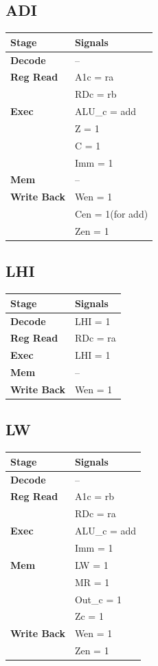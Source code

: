 \documentclass{article}
\begin{document}
\subsection*{ADI}
\begin{tabular}{|l|l|}
\hline
\textbf{Stage} & \textbf{Signals}\\
\hline
\textbf{Decode} & --\\
\hline
\textbf{Reg Read} & A1c = ra\\
                  & RDc = rb\\
\hline
\textbf{Exec} & ALU\_c = add\\
              & Z = 1\\
              & C = 1\\
              & Imm = 1\\
\hline
\textbf{Mem} & --\\
\hline
\textbf{Write Back} & Wen = 1\\
                    & Cen = 1(for add)\\
                    & Zen = 1\\
\hline
\end{tabular}

\subsection*{LHI}
\begin{tabular}{|l|l|}
\hline
\textbf{Stage} & \textbf{Signals}\\
\hline
\textbf{Decode} & LHI = 1\\
\hline
\textbf{Reg Read} & RDc = ra\\
\hline
\textbf{Exec} & LHI = 1\\
\hline
\textbf{Mem} & --\\
\hline
\textbf{Write Back} & Wen = 1\\
\hline
\end{tabular}

\subsection*{LW}
\begin{tabular}{|l|l|}
\hline
\textbf{Stage} & \textbf{Signals}\\
\hline
\textbf{Decode} & --\\
\hline
\textbf{Reg Read} & A1c = rb\\
                  & RDc = ra\\
\hline
\textbf{Exec} & ALU\_c = add\\
              & Imm = 1\\
\hline
\textbf{Mem} & LW = 1\\
             & MR = 1\\
             & Out\_c = 1\\
             & Zc = 1\\
\hline
\textbf{Write Back} & Wen = 1\\
                    & Zen = 1\\
\hline
\end{tabular}
\end{document}
